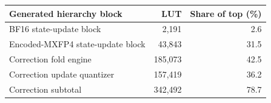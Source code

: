 \begin{tabular}{lrr}
\toprule
Generated hierarchy block & LUT & Share of top (\%) \\
\midrule
BF16 state-update block & 2{,}191 & 2.6 \\
Encoded-MXFP4 state-update block & 43{,}843 & 31.5 \\
Correction fold engine & 185{,}073 & 42.5 \\
Correction update quantizer & 157{,}419 & 36.2 \\
\midrule
Correction subtotal & 342{,}492 & 78.7 \\
\bottomrule
\end{tabular}
